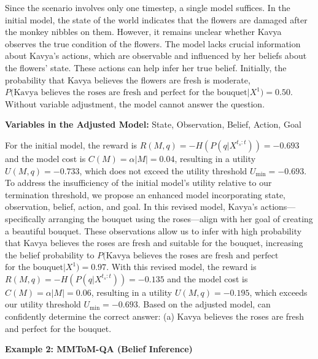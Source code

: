 Since the scenario involves only one timestep, a single model suffices. In the initial model, the state of the world indicates that the flowers are damaged after the monkey nibbles on them. However, it remains unclear whether Kavya observes the true condition of the flowers. The model lacks crucial information about Kavya's actions, which are observable and influenced by her beliefs about the flowers' state. These actions can help infer her true belief. Initially, the probability that Kavya believes the flowers are fresh is moderate, $P(\text{Kavya believes the roses are fresh and perfect}$ $\text{for the bouquet} | X^1) = 0.50$. Without variable adjustment, the model cannot answer the question.

\textbf{Variables in the Adjusted Model: } State, Observation, Belief, Action, Goal 

For the initial model, the reward is $R(M,q)=-H(P(q | X^{t_s:t}))=-0.693$ and the model cost is $C(M)=\alpha|M|=0.04$, resulting in a utility $U(M, q)=-0.733$, which does not exceed the utility threshold $U_\text{min}=-0.693$. To address the insufficiency of the initial model's utility relative to our termination threshold, we propose an enhanced model incorporating state, observation, belief, action, and goal. In this revised model, Kavya’s actions—specifically arranging the bouquet using the roses—align with her goal of creating a beautiful bouquet. These observations allow us to infer with high probability that Kavya believes the roses are fresh and suitable for the bouquet, increasing the belief probability to $P(\text{Kavya believes the roses are fresh and perfect}$ $ \text{for the bouquet}| X^1) = 0.97$. With this revised model, the reward is $R(M,q)=-H(P(q | X^{t_s:t}))=-0.135$ and the model cost is $C(M)=\alpha|M|=0.06$, resulting in a utility $U(M, q)=-0.195$, which exceeds our utility threshold $U_{\text{min}}=-0.693$. Based on the adjusted model, \ours can confidently determine the correct answer: (a) Kavya believes the roses are fresh and perfect for the bouquet.\newline


\textbf{Example 2: MMToM-QA (Belief Inference)}

